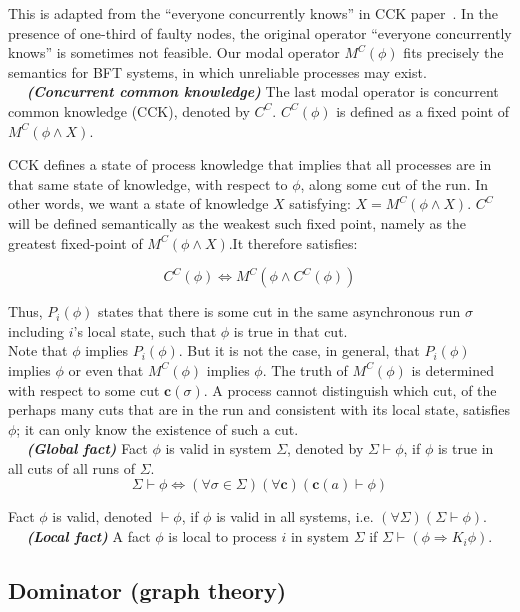 \documentclass{article}
\newcommand{\dfnn}[2]{$\quad$ \textbf{\emph{(#1)}} {#2}}
\renewcommand{\vec}[1]{\mathbf{#1}}
\begin{document}
This is adapted from the ``everyone concurrently knows'' in CCK paper~\cite{cck92}.
In the presence of one-third of faulty nodes, the original operator ``everyone concurrently knows'' is sometimes not feasible.
Our modal operator $M^C(\phi)$ fits precisely the semantics for BFT systems, in which unreliable processes may exist.\\

\dfnn{Concurrent common knowledge}{The last modal operator is concurrent common knowledge (CCK), denoted by $C^C$. $C^C(\phi)$ is defined as a fixed point of $M^C(\phi \wedge X)$.}

CCK defines a state of process knowledge that implies that all processes are in that same state of knowledge, with respect to $\phi$, along some cut of the run. In other words, we want a state of knowledge $X$ satisfying: $X = M^C(\phi \wedge X)$.	
$C^C$ will be defined semantically as the weakest such fixed point, namely as the greatest fixed-point of $M^C(\phi \wedge X)$.It therefore satisfies:

$$C^C(\phi) \Leftrightarrow  M^C(\phi \wedge C^C(\phi))$$

Thus, $P_i(\phi)$ states that there is some cut in the same asynchronous run $\sigma$ including $i$’s local state, such that $\phi$ is true in that cut.\\

Note that $\phi$ implies $P_i(\phi)$. But it is not the case, in general, that $P_i(\phi)$ implies $\phi$ or even that $M^C(\phi)$ implies $\phi$. The truth of $M^C(\phi)$ is determined with respect to some cut $\vec{c}(\sigma)$. A process cannot distinguish which cut, of the perhaps many cuts that are in the run and consistent with its local state, satisfies $\phi$; it can only know the existence of such a cut.\\ 

\dfnn{Global fact}{Fact $\phi$ is valid in system $\Sigma$, denoted by $\Sigma \vdash \phi$, if $\phi$ is true in all cuts of all runs of $\Sigma$.
	$$\Sigma \vdash \phi 
	\Leftrightarrow (\forall \sigma \in \Sigma)(\forall\vec{c}) (\vec{c}(a) \vdash \phi)$$}
	
Fact $\phi$ is valid, denoted $\vdash \phi$, if $\phi$ is valid in all systems, i.e. 
	$(\forall \Sigma) (\Sigma \vdash \phi)$.\\

\dfnn{Local fact}{A fact $\phi$ is local to process $i$ in system $\Sigma$ if
	 $\Sigma \vdash (\phi \Rightarrow K_i \phi)$.}

\subsection{Dominator (graph theory)}
\end{document}
